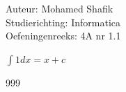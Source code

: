 \documentclass[a4paper]{article}
\begin{document}
\noindent \large Auteur: Mohamed Shafik \\
\noindent \large Studierichting: Informatica\\
\noindent \large Oefeningenreeks: 4A nr 1.1 \\

\medskip

\normalsize

$ \displaystyle\int 1dx = x + c $

\begin{thebibliography}{999}
\end{thebibliography}
\end{document}
